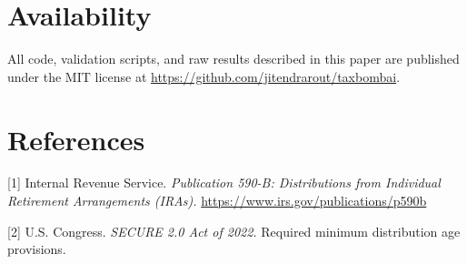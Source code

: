 \documentclass[11pt]{article}
\begin{document}
\section*{Availability}
All code, validation scripts, and raw results described in this paper
are published under the MIT license at
\url{https://github.com/jitendrarout/taxbombai}.

\section*{References}

[1] Internal Revenue Service. \emph{Publication 590-B: Distributions from Individual Retirement Arrangements (IRAs).} \url{https://www.irs.gov/publications/p590b}

[2] U.S. Congress. \emph{SECURE 2.0 Act of 2022.} Required minimum distribution age provisions.
\end{document}
